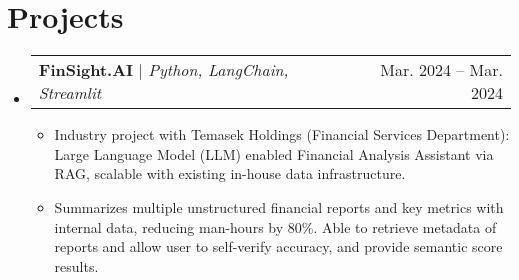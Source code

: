 \documentclass[letterpaper,11pt]{article}
\makeatletter
\newcommand{\resumeItem}[1]{
  \item\small{
    {#1 \vspace{-2pt}}
  }
}
\newcommand{\resumeProjectHeading}[2]{
    \item
    \begin{tabular*}{1.001\textwidth}{l@{\extracolsep{\fill}}r}
      \small#1 & \small #2\\
    \end{tabular*}\vspace{-7pt}
}
\newcommand{\resumeSubHeadingListStart}{\begin{itemize}[leftmargin=0.0in, label={}]}
\newcommand{\resumeSubHeadingListEnd}{\end{itemize}}
\newcommand{\resumeItemListStart}{\begin{itemize}}
\newcommand{\resumeItemListEnd}{\end{itemize}\vspace{-5pt}}
\makeatother
\begin{document}
\vspace{-18pt}
\section{Projects}
    \vspace{-5pt}

    \resumeSubHeadingListStart
      \resumeProjectHeading
          {\textbf{FinSight.AI} $|$ \emph{Python, LangChain, Streamlit}}{Mar. 2024 -- Mar. 2024}
          \resumeItemListStart
            \resumeItem{Industry project with Temasek Holdings (Financial Services Department): Large Language Model (LLM) enabled Financial Analysis Assistant via RAG, scalable with existing in-house data infrastructure.}
            \resumeItem{Summarizes multiple unstructured financial reports and key metrics with internal data, reducing man-hours by 80\%. Able to retrieve metadata of reports and allow user to self-verify accuracy, and provide semantic score results.}
          \resumeItemListEnd
    \resumeSubHeadingListEnd

\end{document}
